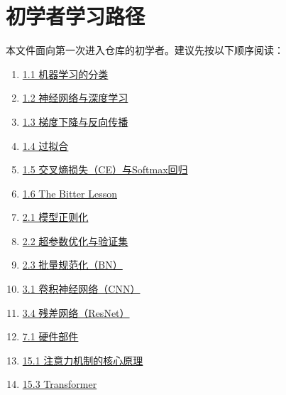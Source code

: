 \hypertarget{ux521dux5b66ux8005ux5b66ux4e60ux8defux5f84}{%
\chapter{初学者学习路径}\label{ux521dux5b66ux8005ux5b66ux4e60ux8defux5f84}}

本文件面向第一次进入仓库的初学者。建议先按以下顺序阅读：

\begin{enumerate}
\def\labelenumi{\arabic{enumi}.}
\tightlist
\item
  \href{docs/01-deep-learning/01-深度学习基础理论/01-01-机器学习的分类.md}{1.1 机器学习的分类}
\item
  \href{docs/01-deep-learning/01-深度学习基础理论/01-02-神经网络与深度学习.md}{1.2 神经网络与深度学习}
\item
  \href{docs/01-deep-learning/01-深度学习基础理论/01-03-梯度下降与反向传播.md}{1.3 梯度下降与反向传播}
\item
  \href{docs/01-deep-learning/01-深度学习基础理论/01-04-过拟合.md}{1.4 过拟合}
\item
  \href{docs/01-deep-learning/01-深度学习基础理论/01-05-交叉熵损失-CE与Softmax回归.md}{1.5 交叉熵损失（CE）与Softmax回归}
\item
  \href{docs/01-deep-learning/01-深度学习基础理论/01-06-The-Bitter-Lesson.md}{1.6 The Bitter Lesson}
\item
  \href{docs/01-deep-learning/02-神经网络训练的常用方法/02-01-模型正则化.md}{2.1 模型正则化}
\item
  \href{docs/01-deep-learning/02-神经网络训练的常用方法/02-02-超参数优化与验证集.md}{2.2 超参数优化与验证集}
\item
  \href{docs/01-deep-learning/02-神经网络训练的常用方法/02-03-批量规范化-BN.md}{2.3 批量规范化（BN）}
\item
  \href{docs/01-deep-learning/03-卷积神经网络/03-01-卷积神经网络-CNN.md}{3.1 卷积神经网络（CNN）}
\item
  \href{docs/01-deep-learning/03-卷积神经网络/03-04-残差网络-ResNet.md}{3.4 残差网络（ResNet）}
\item
  \href{docs/01-deep-learning/07-计算性能与AI-Infra/07-01-硬件部件.md}{7.1 硬件部件}
\item
  \href{docs/03-large-language-model/15-注意力机制与Transformer/15-01-注意力机制的核心原理.md}{15.1 注意力机制的核心原理}
\item
  \href{docs/03-large-language-model/15-注意力机制与Transformer/15-03-Transformer.md}{15.3 Transformer}

\end{enumerate}
